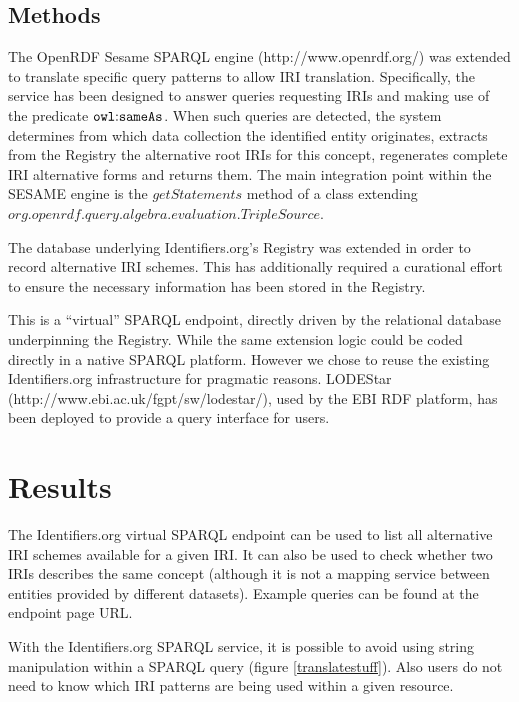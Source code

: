 \documentclass{bioinfo}
\begin{document}
\begin{methods}
\section{Methods}
The OpenRDF Sesame SPARQL engine (http://www.openrdf.org/) was extended to translate specific query patterns to allow IRI translation. Specifically, the service has been designed to answer queries requesting IRIs and making use of the predicate $\mathtt{owl\text{\rm :}{}sameAs}$. When such queries are detected, the system determines from which data collection the identified entity originates, extracts from the Registry the alternative root IRIs for this concept, regenerates complete IRI alternative forms and returns them. The main integration point within the SESAME engine is the $getStatements$ method of a class extending $org.openrdf.query.algebra.evaluation.TripleSource$.

The database underlying Identifiers.org's Registry was extended in order to record alternative IRI schemes. This has additionally required a curational effort to ensure the necessary information has been stored in the Registry.

This is a ``virtual'' SPARQL endpoint, directly driven by the relational database underpinning the Registry.
While the same extension logic could be coded directly in a native SPARQL platform. However we chose to reuse the existing Identifiers.org infrastructure for pragmatic reasons. 
LODEStar (http://www.ebi.ac.uk/fgpt/sw/lodestar/), used by the EBI RDF platform, has been deployed to provide a query interface for users.
\end{methods}

\section{Results}
The Identifiers.org virtual SPARQL endpoint can be used to list all alternative IRI schemes available for a given IRI. It can also be used to check whether two IRIs describes the same concept (although it is not a mapping service between entities provided by different datasets). Example queries can be found at the endpoint page URL.

With the Identifiers.org SPARQL service, it is possible to avoid using string manipulation within a SPARQL query (figure \ref{translatestuff}). Also users do not need to know which IRI patterns are being used within a given resource.
\end{document}
